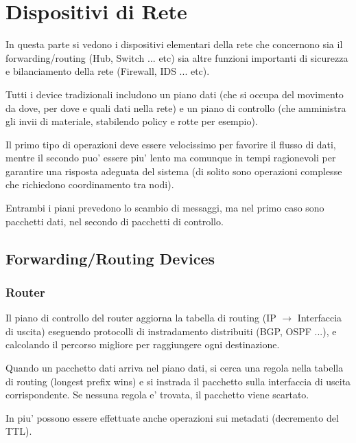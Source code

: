 \chapter{Dispositivi di Rete}

In questa parte si vedono i dispositivi elementari della rete che concernono sia il forwarding/routing (Hub, Switch ... etc) sia altre funzioni importanti di sicurezza e bilanciamento della rete (Firewall, IDS ... etc).


Tutti i device tradizionali includono un piano dati (che si occupa del movimento da dove, per dove e quali dati nella rete) e un piano di controllo (che amministra gli invii di materiale, stabilendo policy e rotte per esempio).

Il primo tipo di operazioni deve essere velocissimo per favorire il flusso di dati, mentre il secondo puo' essere piu' lento ma comunque in tempi ragionevoli per garantire una risposta adeguata del sistema (di solito sono operazioni complesse che richiedono coordinamento tra nodi).

Entrambi i piani prevedono lo scambio di messaggi, ma nel primo caso sono pacchetti dati, nel secondo di pacchetti di controllo.

\section{Forwarding/Routing Devices}

\subsection{Router}

Il piano di controllo del router aggiorna la tabella di routing (IP $\rightarrow$ Interfaccia di uscita) eseguendo protocolli di instradamento distribuiti (BGP, OSPF ...), e calcolando il percorso migliore per raggiungere ogni destinazione.

Quando un pacchetto dati arriva nel piano dati, si cerca una regola nella tabella di routing (longest prefix wins) e si instrada il pacchetto sulla interfaccia di uscita corrispondente. Se nessuna regola e' trovata, il pacchetto viene scartato.

In piu' possono essere effettuate anche operazioni sui metadati (decremento del TTL).


